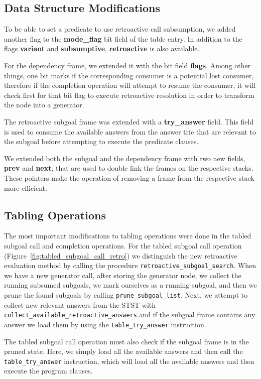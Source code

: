 \subsection{Data Structure Modifications}

To be able to set a predicate to use retroactive call subsumption, we added another flag to the
\textbf{mode\_flag} bit field of the table entry. In addition to the flags \textbf{variant} and 
\textbf{subsumptive}, \textbf{retroactive} is also available.

For the dependency frame, we extended it with the bit field \textbf{flags}. Among other things,
one bit marks if the corresponding consumer is a potential lost consumer, therefore if the completion
operation will attempt to resume the consumer, it will check first for that bit flag to execute
retroactive resolution in order to transform the node into a generator.

The retroactive subgoal frame was extended with a \textbf{try\_answer} field. This field is used
to consume the available answers from the answer trie that are relevant to the subgoal
before attempting to execute the predicate clauses.

We extended both the subgoal and the dependency frame with two new fields, \textbf{prev} and
\textbf{next}, that are used to double link the frames on the respective stacks. These pointers
make the operation of removing a frame from the respective stack more efficient.

\subsection{Tabling Operations}

The most important modifications to tabling operations were done in the tabled subgoal call and
completion operations. For the tabled subgoal call operation (Figure~\ref{fig:tabled_subgoal_call_retro})
we distinguish the new retroactive evaluation method by calling the procedure \texttt{retroactive\_subgoal\_search}.
When we have a new generator call, after storing the
generator node, we collect the running subsumed subgoals, we mark ourselves as a running subgoal, and
then we prune the found subgoals by calling \texttt{prune\_subgoal\_list}.
Next, we attempt to collect new relevant answers from the STST with
\texttt{collect\_available\_retroactive\_answers} and if the subgoal frame contains any answer
we load them by using the \texttt{table\_try\_answer} instruction.

The tabled subgoal call operation must also check if the subgoal frame is in the pruned state. Here,
we simply load all the available answers and then call the \texttt{table\_try\_answer} instruction,
which will load all the available answers and then execute the program clauses.

